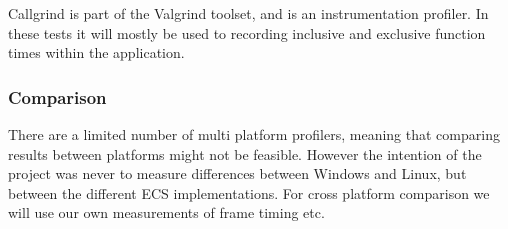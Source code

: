 Callgrind is part of the Valgrind toolset, and is an instrumentation profiler. 
In these tests it will mostly be used to recording inclusive and exclusive function times within the application.

\subsubsection{Comparison}
There are a limited number of multi platform profilers, meaning that comparing results between platforms might not be feasible.
However the intention of the project was never to measure differences between Windows and Linux, but between the different ECS implementations. 
For cross platform comparison we will use our own measurements of frame timing etc.
